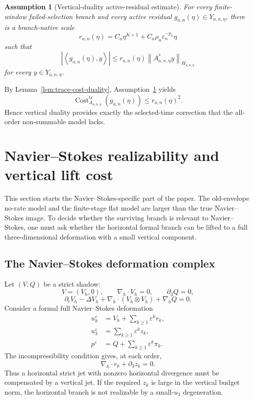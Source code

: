 \documentclass[11pt]{article}
\numberwithin{equation}{section}
\newtheorem{assumption}[theorem]{Assumption}
\DeclareMathOperator{\Cost}{Cost}
\newcommand{\eps}{\varepsilon}
\newcommand{\trc}{\mathrm{tr}}
\newcommand{\nabh}{\nabla_h}
\newcommand{\divh}{\nabla_h\cdot}
\newcommand{\norm}[2]{\left\|#1\right\|_{#2}}
\newcommand{\ip}[2]{\left\langle #1,#2\right\rangle}
\begin{document}
\begin{assumption}[Vertical-duality active-residual estimate]\label{ass:VD}
For every finite-window failed-selection branch and every active residual \(g_{a,n}(\eta)\in Y_{a,n,\eta}\), there is a branch-native scale
\begin{equation}\label{eq:branch-native-scale}
r_{a,n}(\eta)=C_a\eta^{K+1}+C_a\rho_n\eps_n^{-p_a}\eta
\end{equation}
such that
\begin{equation}\label{eq:VD-estimate}
|\ip{g_{a,n}(\eta)}{y}|
\le
r_{a,n}(\eta)\norm{A_{a,n,\eta}^*y}{H_{a,n,\eta}}
\end{equation}
for every \(y\in Y_{a,n,\eta}\).
\end{assumption}

By Lemma~\ref{lem:trace-cost-duality}, Assumption~\ref{ass:VD} yields
\[
\Cost^{\trc}_{A_{a,n,\eta}}(g_{a,n}(\eta))\le r_{a,n}(\eta)^2.
\]
Hence vertical duality provides exactly the selected-time correction that the all-order non-summable model lacks.


\section{Navier--Stokes realizability and vertical lift cost}

This section starts the Navier--Stokes-specific part of the paper. The old-envelope no-rate model and the finite-stage flat model are larger than the true Navier--Stokes image. To decide whether the surviving branch is relevant to Navier--Stokes, one must ask whether the horizontal formal branch can be lifted to a full three-dimensional deformation with a small vertical component.

\subsection{The Navier--Stokes deformation complex}

Let \((V,Q)\) be a strict shadow:
\[
V=(V_h,0),
\qquad
\divh V_h=0,
\qquad
\partial_3Q=0,
\]
\[
\partial_tV_h-\Delta V_h+\nabh\cdot(V_h\otimes V_h)+\nabh Q=0.
\]
Consider a formal full Navier--Stokes deformation
\begin{align}
 u_h^\eps&=V_h+\sum_{k\ge1}\eps^k r_k,\label{eq:uh-expansion}\\
 u_3^\eps&=\sum_{k\ge1}\eps^k z_k,\label{eq:u3-expansion}\\
 p^\eps&=Q+\sum_{k\ge1}\eps^k\pi_k.\label{eq:p-expansion}
\end{align}
The incompressibility condition gives, at each order,
\begin{equation}\label{eq:jet-divergence}
\divh r_k+\partial_3z_k=0.
\end{equation}
Thus a horizontal strict jet with nonzero horizontal divergence must be compensated by a vertical jet.  If the required \(z_k\) is large in the vertical budget norm, the horizontal branch is not realizable by a small-\(u_3\) degeneration.
\end{document}
